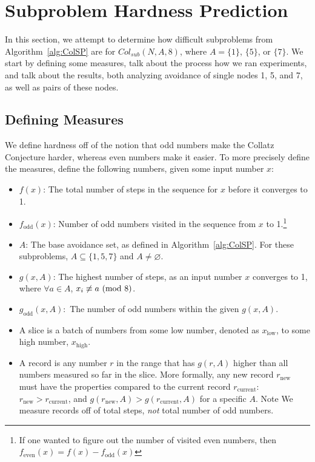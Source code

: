 \chapter{Subproblem Hardness Prediction} \label{sec:subhrdnspred}
In this section, we attempt to determine how difficult subproblems from Algorithm~\ref{alg:ColSP} are for $Col_{sub}(N,A,8)$, where $A= \{1\}$, $\{5\}$, or $\{7\}$. We start by defining some measures, talk about the process how we ran experiments, and talk about the results, both analyzing avoidance of single nodes 1, 5, and 7, as well as pairs of these nodes.
\section{Defining Measures} \label{subsec:algdefinemeasure} 
We define hardness off of the notion that odd numbers make the Collatz Conjecture harder, whereas even numbers make it easier. To more precisely define the measures, define the following numbers, given some input number $x$:
\begin{itemize}
    \item $f(x)$: The total number of steps in the sequence for $x$ before it converges to 1.
    \item $f_\text{odd}(x)$: Number of odd numbers visited in the sequence from $x$ to 1.\footnote{If one wanted to figure out the number of visited even numbers, then $f_\text{even}(x) = f(x) - f_\text{odd}(x)$} 
    \item $A$: The base avoidance set, as defined in Algorithm~\ref{alg:ColSP}. For these subproblems, $A \subseteq \{1, 5, 7\}$ and $A \ne \varnothing$.
    \item $g(x,A)$: The highest number of steps, as an input number $x$ converges to 1, where $\forall a \in A$, $x_i \not\equiv a \ (\mathrm{mod}\ 8)$.
    \item $g_\text{odd}(x,A):$ The number of odd numbers within the given $g(x,A)$.
    \item A slice is a batch of numbers from some low number, denoted as $x_\text{low}$, to some high number, $x_\text{high}$.
    \item A record is any number $r$ in the range that has $g(r,A)$ higher than all numbers measured so far in the slice. More formally, any new record $r_\text{new}$ must have the properties compared to the current record $r_\text{current}$: $r_\text{new} > r_\text{current}$, and $g(r_\text{new},A) > g(r_\text{current},A)$ for a specific $A$. Note We measure records off of total steps, \textit{not} total number of odd numbers.
\end{itemize}
